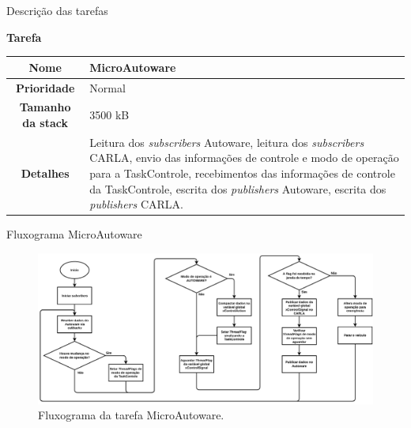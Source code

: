 \documentclass{if-beamer}
\begin{document}
\begin{frame}{Descrição das tarefas}

\begin{block}{\textbf{Tarefa}}
	
	\centering
	
	\begin{tabular}{c|p{8cm}}
		\textbf{Nome} & MicroAutoware \\
		\hline
		\textbf{Prioridade}& Normal \\
		\hline
		\textbf{Tamanho da stack} & 3500 kB \\
		\hline
		\textbf{Detalhes} & Leitura dos \textit{subscribers} Autoware, leitura dos \textit{subscribers} CARLA, envio das informações de controle e modo de operação para a TaskControle, recebimentos das informações de controle da TaskControle, escrita dos \textit{publishers} Autoware, escrita dos \textit{publishers} CARLA. \\
	\end{tabular}
	
\end{block}	

\end{frame}




\begin{frame}{Fluxograma MicroAutoware}
	
	\begin{figure}[H]
		\centering
		\includegraphics[width=\linewidth]{img/fluxograma_microautoware}
		\caption{Fluxograma da tarefa MicroAutoware.}
		\label{fig:fluxograma_microautoware}
	\end{figure}
	
\end{frame}
\end{document}
